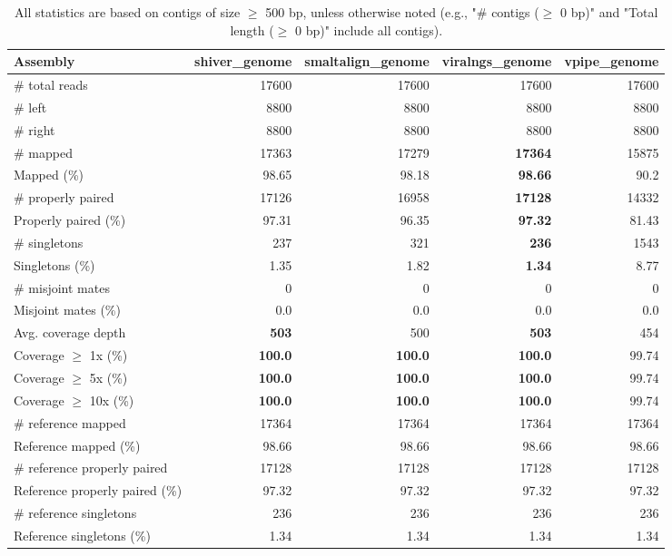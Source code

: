 \documentclass[12pt,a4paper]{article}
\begin{document}
\begin{table}[ht]
\begin{center}
\caption{All statistics are based on contigs of size $\geq$ 500 bp, unless otherwise noted (e.g., "\# contigs ($\geq$ 0 bp)" and "Total length ($\geq$ 0 bp)" include all contigs).}
\begin{tabular}{|l*{4}{|r}|}
\hline
Assembly & shiver\_genome & smaltalign\_genome & viralngs\_genome & vpipe\_genome \\ \hline
\# total reads & 17600 & 17600 & 17600 & 17600 \\ \hline
\# left & 8800 & 8800 & 8800 & 8800 \\ \hline
\# right & 8800 & 8800 & 8800 & 8800 \\ \hline
\# mapped & 17363 & 17279 & {\bf 17364} & 15875 \\ \hline
Mapped (\%) & 98.65 & 98.18 & {\bf 98.66} & 90.2 \\ \hline
\# properly paired & 17126 & 16958 & {\bf 17128} & 14332 \\ \hline
Properly paired (\%) & 97.31 & 96.35 & {\bf 97.32} & 81.43 \\ \hline
\# singletons & 237 & 321 & {\bf 236} & 1543 \\ \hline
Singletons (\%) & 1.35 & 1.82 & {\bf 1.34} & 8.77 \\ \hline
\# misjoint mates & 0 & 0 & 0 & 0 \\ \hline
Misjoint mates (\%) & 0.0 & 0.0 & 0.0 & 0.0 \\ \hline
Avg. coverage depth & {\bf 503} & 500 & {\bf 503} & 454 \\ \hline
Coverage $\geq$ 1x (\%) & {\bf 100.0} & {\bf 100.0} & {\bf 100.0} & 99.74 \\ \hline
Coverage $\geq$ 5x (\%) & {\bf 100.0} & {\bf 100.0} & {\bf 100.0} & 99.74 \\ \hline
Coverage $\geq$ 10x (\%) & {\bf 100.0} & {\bf 100.0} & {\bf 100.0} & 99.74 \\ \hline
\# reference mapped & 17364 & 17364 & 17364 & 17364 \\ \hline
Reference mapped (\%) & 98.66 & 98.66 & 98.66 & 98.66 \\ \hline
\# reference properly paired & 17128 & 17128 & 17128 & 17128 \\ \hline
Reference properly paired (\%) & 97.32 & 97.32 & 97.32 & 97.32 \\ \hline
\# reference singletons & 236 & 236 & 236 & 236 \\ \hline
Reference singletons (\%) & 1.34 & 1.34 & 1.34 & 1.34 \\ \hline

\end{tabular}
\end{center}
\end{table}
\end{document}
